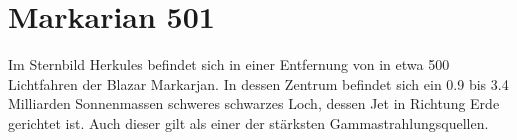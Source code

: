 \section{Markarian 501}
Im Sternbild Herkules befindet sich in einer Entfernung von in etwa 500 Lichtfahren der Blazar Markarjan. 
In dessen Zentrum befindet sich ein \num{0.9} bis \num{3.4} Milliarden Sonnenmassen schweres schwarzes Loch, dessen Jet in Richtung Erde gerichtet ist.
Auch dieser gilt als einer der stärksten Gammastrahlungsquellen.
